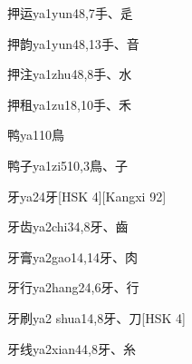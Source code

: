 \begin{entry}{押运}{ya1yun4}{8,7}{⼿、⾡}
\end{entry}

\begin{entry}{押韵}{ya1yun4}{8,13}{⼿、⾳}
\end{entry}

\begin{entry}{押注}{ya1zhu4}{8,8}{⼿、⽔}
\end{entry}

\begin{entry}{押租}{ya1zu1}{8,10}{⼿、⽲}
\end{entry}

\begin{entry}{鸭}{ya1}{10}{⿃}
\end{entry}

\begin{entry}{鸭子}{ya1zi5}{10,3}{⿃、⼦}
\end{entry}

\begin{entry}{牙}{ya2}{4}{⽛}[HSK 4][Kangxi 92]
\end{entry}

\begin{entry}{牙齿}{ya2chi3}{4,8}{⽛、⿒}
\end{entry}

\begin{entry}{牙膏}{ya2gao1}{4,14}{⽛、⾁}
\end{entry}

\begin{entry}{牙行}{ya2hang2}{4,6}{⽛、⾏}
\end{entry}

\begin{entry}{牙刷}{ya2 shua1}{4,8}{⽛、⼑}[HSK 4]
\end{entry}

\begin{entry}{牙线}{ya2xian4}{4,8}{⽛、⽷}
\end{entry}

